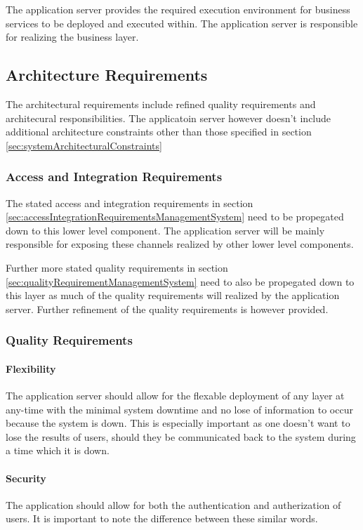 The application server provides the required execution environment for business
services to be deployed and executed within. The application server is responsible
for realizing the business layer.

\subsection{Architecture Requirements}
The architectural requirements include refined quality requirements and architecural
responsibilities. The applicatoin server however doesn't include additional
architecture constraints other than those specified in section \ref{sec:systemArchitecturalConstraints}

\subsubsection{Access and Integration Requirements}
The stated access and integration requirements in section \ref{sec:accessIntegrationRequirementsManagementSystem}
need to be propegated down to this lower level component. The application server
will be mainly responsible for exposing these channels realized by other lower
level components.

Further more stated quality requirements in section \ref{sec:qualityRequirementManagementSystem}
need to also be propegated down to this layer as much of the quality
requirements will realized by the application server. Further refinement of the
quality requirements is however provided.

\subsubsection{Quality Requirements}
\paragraph{Flexibility}
The application server should allow for the flexable deployment of any layer at
any-time with the minimal system downtime and no lose of information to occur
because the system is down. This is especially important as one doesn't want to
lose the results of users, should they be communicated back to the system
during a time which it is down.

\paragraph{Security}
The application should allow for both the authentication and autherization of
users. It is important to note the difference between these similar words.

